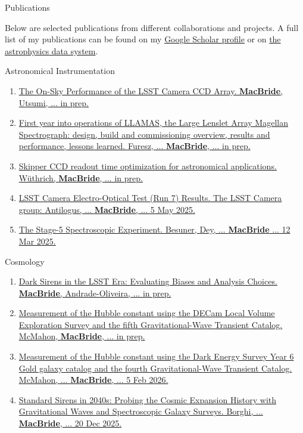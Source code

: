 \documentclass{resume} %
\begin{document}
\begin{rSection}{Publications}


Below are selected publications from different collaborations and projects. A full list of my publications can be found on my \href{https://scholar.google.com/citations?user=XtRTswUAAAAJ&hl=en}{Google Scholar profile} or on \href{https://ui.adsabs.harvard.edu/search/fq=\%7B!type\%3Daqp\%20v\%3D\%24fq_database\%7D&fq_database=(database\%3Aastronomy\%20OR\%20database\%3Aphysics)&p_=0&q=((\%20author\%3A\%22Macbride\%2C\%20Sean\%22)\%20AND\%20year\%3A2019-2150)&sort=date\%20desc\%2C\%20bibcode\%20desc}{the astrophysics data system}.

\begin{rSubsection}{Astronomical Instrumentation}{}{}{}
\begin{enumerate}
    \item \href{}{The On-Sky Performance of the LSST Camera CCD Array. \textbf{MacBride}, Utsumi, ... in prep.}
    \item \href{}{First year into operations of LLAMAS, the Large Lenslet Array Magellan Spectrograph: design, build and commissioning overview, results and performance, lessons learned. Furesz, ... \textbf{MacBride}, ... in prep.}
    \item  \href{}{Skipper CCD readout time optimization for astronomical applications. Wüthrich, \textbf{MacBride}, ... in prep.} 
    \item \href{https://sitcomtn-148.lsst.io/}{LSST Camera Electro-Optical Test (Run 7) Results. The LSST Camera group: Antilogus, ... \textbf{MacBride}, ... 5 May 2025.}
    \item \href{https://arxiv.org/abs/2503.07923}{The Stage-5 Spectroscopic Experiment. Besuner, Dey, ... \textbf{MacBride} ... 12 Mar 2025.}    
\end{enumerate}
\end{rSubsection}

\begin{rSubsection}{Cosmology}{}{}{}
\begin{enumerate}
    \item \href{}{Dark Sirens in the LSST Era: Evaluating Biases and Analysis Choices. \textbf{MacBride}, Andrade-Oliveira, ... in prep.} 
    \item \href{}{Measurement of the Hubble constant using the DECam Local Volume Exploration Survey and the fifth Gravitational-Wave Transient Catalog. McMahon, \textbf{MacBride}, ... in prep.} 
    \item \href{https://arxiv.org/pdf/2602.04766}{Measurement of the Hubble constant using the Dark Energy Survey Year 6 Gold galaxy catalog and the fourth Gravitational-Wave Transient Catalog. McMahon, ... \textbf{MacBride}, ... 5 Feb 2026.} 
    \item \href{https://arxiv.org/pdf/2512.18369}{Standard Sirens in 2040s: Probing the Cosmic Expansion History with Gravitational Waves and Spectroscopic Galaxy Surveys. Borghi, ... \textbf{MacBride}, ... 20 Dec 2025.} 
    

\end{enumerate}
\end{rSubsection}
\end{rSection}
\end{document}
